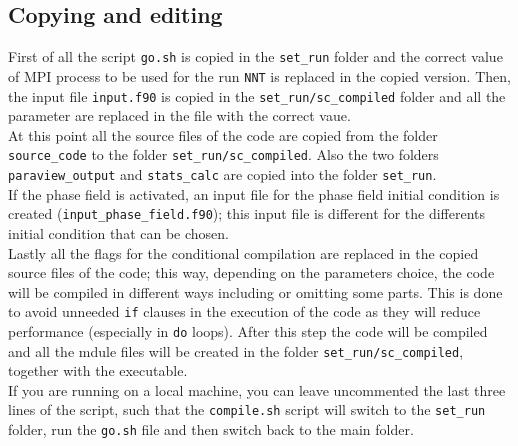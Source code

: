 \subsection{Copying and editing}
First of all the script \texttt{go.sh} is copied in the \texttt{set\_run} folder and the correct value of MPI process to be used for the run \texttt{NNT} is replaced in the copied version. Then, the input file \texttt{input.f90} is copied in the \texttt{set\_run/sc\_compiled} folder and all the parameter are replaced in the file with the correct vaue.\\
At this point all the source files of the code are copied from the folder \texttt{source\_code} to the folder \texttt{set\_run/sc\_compiled}. Also the two folders \texttt{paraview\_output} and \texttt{stats\_calc} are copied into the folder \texttt{set\_run}.\\
If the phase field is activated, an input file for the phase field initial condition is created (\texttt{input\_phase\_field.f90}); this input file is different for the differents initial condition that can be chosen.\\
Lastly all the flags for the conditional compilation are replaced in the copied source files of the code; this way, depending on the parameters choice, the code will be compiled in different ways including or omitting some parts. This is done to avoid unneeded \texttt{if} clauses in the execution of the code as they will reduce performance (especially in \texttt{do} loops). After this step the code will be compiled and all the mdule files will be created in the folder \texttt{set\_run/sc\_compiled}, together with the executable.\\
If you are running on a local machine, you can leave uncommented the last three lines of the script, such that the \texttt{compile.sh} script will switch to the \texttt{set\_run} folder, run the \texttt{go.sh} file and then switch back to the main folder.
